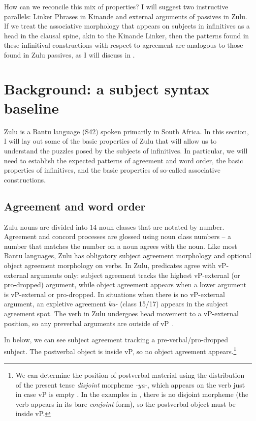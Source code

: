 \documentclass[output=paper,colorlinks,citecolor=brown]{langscibook}
\begin{document}
How can we reconcile this mix of properties? I will suggest two instructive parallels: Linker Phrases in Kinande \citep{BakerCollins2006, Schneider-Zioga2015ACAL, Schneider-Zioga2015WCCFL} and external arguments of passives in Zulu. If we treat the associative morphology that appears on subjects in infinitives as a head in the clausal spine, akin to the Kinande Linker, then the patterns found in these infinitival constructions with respect to agreement are analogous to those found in Zulu passives, as I will discuss in . 

\section{Background: a subject syntax baseline}\label{sec:halpert:2}

Zulu is a Bantu language (S42) spoken primarily in South Africa.  In this section, I will lay out some of the basic properties of Zulu that will allow us to understand the puzzles posed by the subjects of infinitives.  In particular, we will need to establish the expected patterns of agreement and word order, the basic properties of infinitives, and the basic properties of so-called associative constructions.

\subsection{Agreement and word order}\label{sec:halpert:2.1}

Zulu nouns are divided into 14 noun classes that are notated by number. Agreement and concord processes are glossed using  noun class numbers – a number that matches the number on a noun agrees with the noun. Like most Bantu languages, Zulu has obligatory subject agreement morphology and optional object agreement morphology on verbs. In Zulu, predicates agree with vP-external arguments only: subject agreement tracks the highest vP-external (or pro-dropped) argument, while object agreement appears when a lower argument is vP-external or pro-dropped. In situations when there is no vP-external argument, an expletive agreement \textit{ku-} (class 15/17) appears in the subject agreement spot.  The verb in Zulu undergoes head movement to a vP-external position, so any preverbal arguments are outside of vP \citep{Buell2005,Halpert2015}.

In  below, we can see subject agreement tracking a pre-verbal/pro-dropped subject.  The postverbal object is inside vP, so no object agreement appears.\footnote{We can determine the position of postverbal material using the distribution of the present tense \textit{disjoint} morpheme \textit{-ya-}, which appears on the verb just in case vP is empty \citep{Buell2005, Halpert2015, Halpert2017}.  In the examples in , there is no disjoint morpheme (the verb appears in its bare \textit{conjoint} form), so the postverbal object must be inside vP.}
\end{document}
